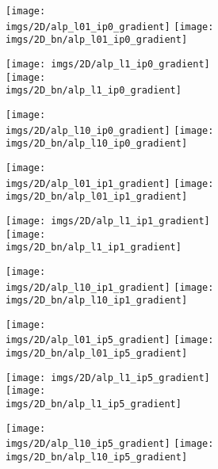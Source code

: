 \documentclass{article}
\begin{document}
\begin{figure}[h]
\begin{subfigure}{\linewidth}
\begin{subfigure}{.33\linewidth}
  \texttt{[image: imgs/2D/alp\_l01\_ip0\_gradient]}\hfill
  \texttt{[image: imgs/2D\_bn/alp\_l01\_ip0\_gradient]}
  \caption{}
\end{subfigure}
\begin{subfigure}{.33\linewidth}
  \texttt{[image: imgs/2D/alp\_l1\_ip0\_gradient]}\hfill
  \texttt{[image: imgs/2D\_bn/alp\_l1\_ip0\_gradient]}
  \caption{}
\end{subfigure}
\begin{subfigure}{.33\linewidth}
  \texttt{[image: imgs/2D/alp\_l10\_ip0\_gradient]}\hfill
  \texttt{[image: imgs/2D\_bn/alp\_l10\_ip0\_gradient]}
  \caption{}
\end{subfigure}
\end{subfigure}\par

\begin{subfigure}{\linewidth}
\begin{subfigure}{.33\linewidth}
  \texttt{[image: imgs/2D/alp\_l01\_ip1\_gradient]}\hfill
  \texttt{[image: imgs/2D\_bn/alp\_l01\_ip1\_gradient]}
  \caption{}
\end{subfigure}
\begin{subfigure}{.33\linewidth}
  \texttt{[image: imgs/2D/alp\_l1\_ip1\_gradient]}\hfill
  \texttt{[image: imgs/2D\_bn/alp\_l1\_ip1\_gradient]}
  \caption{}
\end{subfigure}
\begin{subfigure}{.33\linewidth}
  \texttt{[image: imgs/2D/alp\_l10\_ip1\_gradient]}\hfill
  \texttt{[image: imgs/2D\_bn/alp\_l10\_ip1\_gradient]}
  \caption{}
\end{subfigure}
\end{subfigure}\par

\begin{subfigure}{\linewidth}
\begin{subfigure}{.33\linewidth}
  \texttt{[image: imgs/2D/alp\_l01\_ip5\_gradient]}\hfill
  \texttt{[image: imgs/2D\_bn/alp\_l01\_ip5\_gradient]}
  \caption{}
\end{subfigure}
\begin{subfigure}{.33\linewidth}
  \texttt{[image: imgs/2D/alp\_l1\_ip5\_gradient]}\hfill
  \texttt{[image: imgs/2D\_bn/alp\_l1\_ip5\_gradient]}
  \caption{}
\end{subfigure}
\begin{subfigure}{.33\linewidth}
  \texttt{[image: imgs/2D/alp\_l10\_ip5\_gradient]}\hfill
  \texttt{[image: imgs/2D\_bn/alp\_l10\_ip5\_gradient]}
  \caption{}
\end{subfigure}
\end{subfigure}\par


\end{figure}
\end{document}

